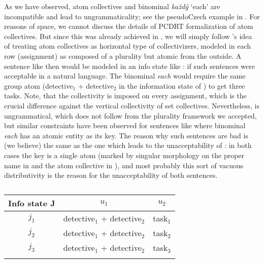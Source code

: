 \documentclass[output=paper,colorlinks,citecolor=brown,newtxmath]{langscibook}
\begin{document}
As we have observed, atom collectives and binominal \textit{každý} `each' are incompatible and lead to ungrammaticality; see the pseudoCzech example in . For reasons of space, we cannot discuss the details of PCDRT formalization of atom collectives. But since this was already achieved in \cite{Dotlacil2013}, we will simply follow \citeauthor{Dotlacil2013}'s idea of treating atom collectives as horizontal type of collectivizers, modeled in each row (assignment) as composed of a plurality but atomic from the outside. A sentence like  then would be modeled in an info state like : if such sentences were acceptable in a natural language. The binominal \textit{each} would require the same group atom (detective$_1$ + detective$_2$ in the information state of ) to get three tasks. Note, that the collectivity is imposed on every assignment, which is the crucial difference against the vertical collectivity of set collectives. Nevertheless,  is ungrammatical, which does not follow from the plurality framework we accepted, but similar constraints have been observed for sentences like  where binominal \textit{each} has an atomic entity as its key.
The reason why such sentences are bad is (we believe) the same as the one which leads to the unacceptability of : in both cases the key is a single atom (marked by singular morphology on the proper name in  and the atom collective in ), and most probably this sort of vacuous distributivity is the reason for the unacceptability of both sentences.

\label{ex:sec-bin-each-atom-coll}
\z

\begin{table}
\centering
\begin{tabularx}{0.6\textwidth}{ccc}
\lsptoprule
Info state J & \(u_1\) & \(u_2\)\tabularnewline
\midrule
\(j_1\) & detective\(_1\) + detective\(_2\) & task\(_1\)\tabularnewline
\(j_2\) & detective\(_1\) + detective\(_2\) & task\(_2\)\tabularnewline
\(j_3\) & detective\(_1\) + detective\(_2\) & task\(_3\)\tabularnewline
\lspbottomrule
\end{tabularx}
\caption{}
\label{table6}
\end{table}

\z
\end{document}
